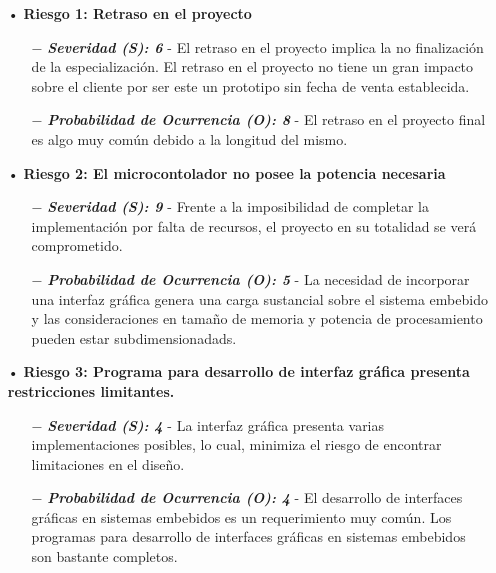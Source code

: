 \documentclass[11pt]{charter}
\begin{document}
\begin{itemize}
 \item[•] \textbf{Riesgo 1: Retraso en el proyecto}
  \begin{itemize}
  	\item[$-$] \textit{\textbf{Severidad (S): 6}} - El retraso en el proyecto implica la no finalización de la especialización. El retraso en el proyecto no tiene un gran impacto sobre el cliente por ser este un prototipo sin fecha de venta establecida.
  	\item[$-$] \textit{\textbf{Probabilidad de Ocurrencia (O): 8}} - El retraso en el proyecto final es algo muy común debido a la longitud del mismo.
  \end{itemize}
\end{itemize}

\begin{itemize}
 \item[•] \textbf{Riesgo 2: El microcontolador no posee la potencia necesaria}
  \begin{itemize}
  	\item[$-$] \textit{\textbf{Severidad (S): 9}} - Frente a la imposibilidad de completar la implementación por falta de recursos, el proyecto en su totalidad se verá comprometido.
  	\item[$-$] \textit{\textbf{Probabilidad de Ocurrencia (O): 5}} - La necesidad de incorporar una interfaz gráfica genera una carga sustancial sobre el sistema embebido y las consideraciones en tamaño de memoria y potencia de procesamiento pueden estar subdimensionadads. 
  \end{itemize}
\end{itemize}

\begin{itemize}
 \item[•] \textbf{Riesgo 3: Programa para desarrollo de interfaz gráfica presenta restricciones limitantes.}
  \begin{itemize}
  	\item[$-$] \textit{\textbf{Severidad (S): 4}} - La interfaz gráfica presenta varias implementaciones posibles, lo cual, minimiza el riesgo de encontrar limitaciones en el diseño.
  	\item[$-$] \textit{\textbf{Probabilidad de Ocurrencia (O): 4}} - El desarrollo de interfaces gráficas en sistemas embebidos es un requerimiento muy común. Los programas para desarrollo de interfaces gráficas en sistemas embebidos son bastante completos. 
  \end{itemize}
\end{itemize}
\end{document}
